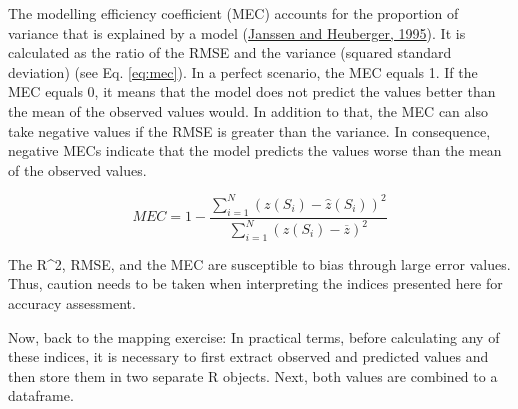 \documentclass[
  10pt,
  b5paper,
  oneside]{book}
\begin{document}
The modelling efficiency coefficient (MEC) accounts for the proportion of variance that is explained by a model (\protect\hyperlink{ref-Janssen1995}{Janssen and Heuberger, 1995}). It is calculated as the ratio of the RMSE and the variance (squared standard deviation) (see Eq. \eqref{eq:mec}). In a perfect scenario, the MEC equals 1. If the MEC equals 0, it means that the model does not predict the values better than the mean of the observed values would. In addition to that, the MEC can also take negative values if the RMSE is greater than the variance. In consequence, negative MECs indicate that the model predicts the values worse than the mean of the observed values.

\begin{equation} 
  MEC = 1 - \frac{\sum_{i=1}^{N}(z(S_{i})-\hat{z}(S_{i}))^2}{\sum_{i=1}^{N}(z(S_{i})-\overline{z})^2}
  \label{eq:mec}
\end{equation}

The R\^{}2, RMSE, and the MEC are susceptible to bias through large error values. Thus, caution needs to be taken when interpreting the indices presented here for accuracy assessment.

Now, back to the mapping exercise: In practical terms, before calculating any of these indices, it is necessary to first extract observed and predicted values and then store them in two separate R objects. Next, both values are combined to a dataframe.
\end{document}
